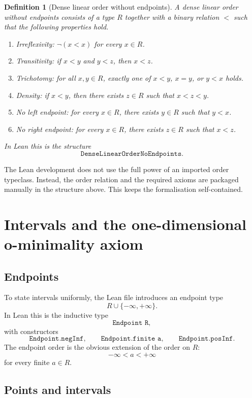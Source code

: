\documentclass[11pt]{article}
\newtheorem{definition}{Definition}[section]
\newcommand{\Lean}[1]{\texttt{#1}}
\begin{document}
\begin{definition}[Dense linear order without endpoints]
A dense linear order without endpoints consists of a type $R$ together with a binary relation $<$ such
that the following properties hold.
\begin{enumerate}[label=(\roman*)]
  \item Irreflexivity: $\neg(x<x)$ for every $x\in R$.
  \item Transitivity: if $x<y$ and $y<z$, then $x<z$.
  \item Trichotomy: for all $x,y\in R$, exactly one of $x<y$, $x=y$, or $y<x$ holds.
  \item Density: if $x<y$, then there exists $z\in R$ such that $x<z<y$.
  \item No left endpoint: for every $x\in R$, there exists $y\in R$ such that $y<x$.
  \item No right endpoint: for every $x\in R$, there exists $z\in R$ such that $x<z$.
\end{enumerate}
In Lean this is the structure
\[
  \Lean{DenseLinearOrderNoEndpoints}.
\]
\end{definition}

The Lean development does not use the full power of an imported order typeclass.  Instead, the order
relation and the required axioms are packaged manually in the structure above.  This keeps the
formalisation self-contained.

\section{Intervals and the one-dimensional o-minimality axiom}

\subsection{Endpoints}

To state intervals uniformly, the Lean file introduces an endpoint type
\[
  R\cup\{-\infty,+\infty\}.
\]
In Lean this is the inductive type
\[
  \Lean{Endpoint R},
\]
with constructors
\[
  \Lean{Endpoint.negInf},
  \qquad
  \Lean{Endpoint.finite a},
  \qquad
  \Lean{Endpoint.posInf}.
\]
The endpoint order is the obvious extension of the order on $R$:
\[
  -\infty<a<+\infty
\]
for every finite $a\in R$.

\subsection{Points and intervals}
\end{document}
